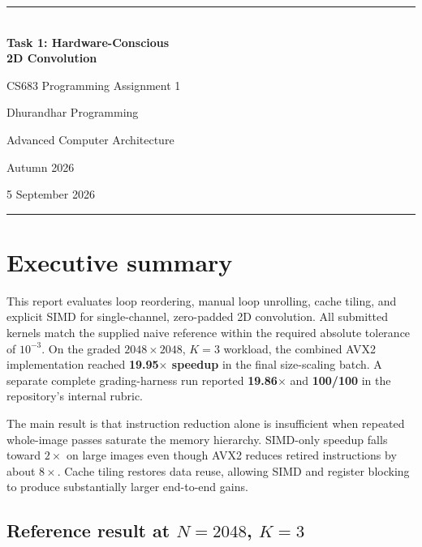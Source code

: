 \documentclass[10pt,letterpaper]{article}
\begin{document}
\hypersetup{pageanchor=false}
\begin{titlepage}
\thispagestyle{empty}
\vspace*{1.0in}
{\color{blue}\rule{\textwidth}{2.5pt}}\\[0.35in]
{\fontsize{30}{36}\selectfont\bfseries\color{navy} Task 1: Hardware-Conscious\\[3pt]2D Convolution}\par
\vspace{0.28in}
{\Large CS683 Programming Assignment 1}\par
\vspace{0.10in}
{\large Dhurandhar Programming}\par
\vfill
{\large Advanced Computer Architecture}\par
{\large Autumn 2026}\par
\vspace{0.18in}
{\large 5 September 2026}\par
\vspace{0.55in}
{\color{blue}\rule{\textwidth}{1pt}}
\end{titlepage}
\hypersetup{pageanchor=true}
\setcounter{page}{1}

\section{Executive summary}

This report evaluates loop reordering, manual loop unrolling, cache tiling, and explicit SIMD for single-channel, zero-padded 2D convolution. All submitted kernels match the supplied naive reference within the required absolute tolerance of $10^{-3}$. On the graded $2048\times2048$, $K=3$ workload, the combined AVX2 implementation reached \textbf{19.95$\times$ speedup} in the final size-scaling batch. A separate complete grading-harness run reported \textbf{19.86$\times$} and \textbf{100/100} in the repository's internal rubric.

The main result is that instruction reduction alone is insufficient when repeated whole-image passes saturate the memory hierarchy. SIMD-only speedup falls toward $2\times$ on large images even though AVX2 reduces retired instructions by about $8\times$. Cache tiling restores data reuse, allowing SIMD and register blocking to produce substantially larger end-to-end gains.

\subsection{Reference result at \texorpdfstring{$N=2048$, $K=3$}{N=2048, K=3}}
\end{document}
